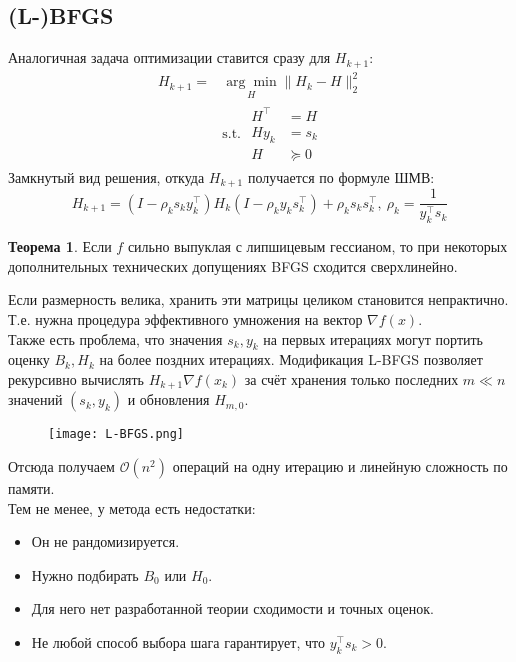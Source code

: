 \documentclass[11pt,a4paper]{report}
\theoremstyle{definition}
\theoremstyle{definition}
\newtheorem{theorem}{Теорема}[section]
\theoremstyle{definition}
\begin{document}
	\subsection{(L-)BFGS}
	Аналогичная задача оптимизации ставится сразу для $H_{k+1}$:
	\begin{align*}
		H_{k+1} = &\underset{H}{\arg\min} \| H_k - H \|_2^2\\
		&\text{s.t. } 
		\begin{aligned} 
		H^{\top} &= H\\ 
		H y_k &= s_k\\
		H &\succeq 0
		\end{aligned}
	\end{align*}
	Замкнутый вид решения, откуда $ H_{k+1} $ получается по формуле ШМВ:
	$$
		H_{k+1} = (I - \rho_k s_k y_k^\top) H_k (I - \rho_k y_k s_k^{\top}) + \rho_k s_k s_k^{\top},\ \rho_k = \frac{1}{y_k^\top s_k}
	$$
	\begin{theorem}
		Если $ f $ сильно выпуклая с липшицевым гессианом, то при некоторых дополнительных технических допущениях BFGS сходится сверхлинейно.
	\end{theorem}
	\noindent Если размерность велика, хранить эти матрицы целиком становится непрактично.\\
	Т.е. нужна процедура эффективного умножения на вектор $ \nabla f(x) $.\\
	Также есть проблема, что значения $ s_k, y_k $ на первых итерациях могут портить оценку $ B_k, H_k $ на более поздних итерациях.	Модификация L-BFGS позволяет рекурсивно вычислять $ H_{k+1} \nabla f(x_k) $ за счёт хранения только последних $ m \ll n $ значений $ (s_k, y_k) $ и обновления $ H_{m,0} $. 
	\begin{figure}[H]
		\texttt{[image: L-BFGS.png]}
	\end{figure}
	\noindent Отсюда получаем $ \mathcal{O}(n^2) $ операций на одну итерацию и линейную сложность по памяти.\\
	Тем не менее, у метода есть недостатки:
	\begin{itemize}[$\diamond$]
		\item Он не рандомизируется.
		\item Нужно подбирать $ B_0 $ или $ H_0 $.
		\item Для него нет разработанной теории сходимости и точных оценок.
		\item Не любой способ выбора шага гарантирует, что $ y_k^\top s_k > 0 $.
	\end{itemize}
\end{document}
